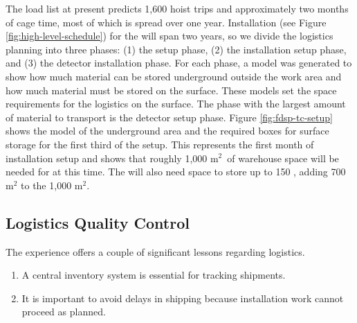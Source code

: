 The load list at present predicts 1,600 hoist trips and approximately two  months of cage time, most of which is spread over one year. Installation %
(see Figure \ref{fig:high-level-schedule}) for the  %
will span two years, so we divide the logistics planning into three  %
phases: %
(1) the  setup phase, (2) the installation setup phase, and (3) the detector installation phase. For each phase, a model was generated to show how much material can be stored underground outside the work area and how much material must be stored on the surface. These models set the space requirements for the logistics on the surface. The phase with the largest amount of material to transport is the detector setup phase.   Figure \ref{fig:fdsp-tc-setup} shows the model of the underground area and the required boxes for surface storage for the first third of the setup. This represents the first month of installation setup and shows that roughly 1,000 m$^2$\ of warehouse space will be needed for  at this time.  The %
 will also need space to store up to 150 , %
adding %
700 m$^2$ to the 1,000 m$^2$. %


\subsection{Logistics Quality Control}
\label{sec:fdsp-tc-log-qaqc}


The  experience offers a couple of significant lessons regarding logistics.

\begin{enumerate}
\item A central inventory system is essential for tracking  shipments.
\item It is important to avoid delays in shipping because installation work cannot proceed as planned. 
\end{enumerate}

